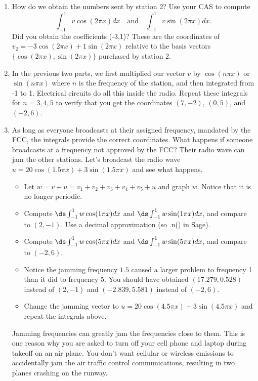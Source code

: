 \begin{enumerate}
\begin{enumerate}
	\item How do we obtain the numbers sent by station 2? Use your CAS to compute
	$$ \int_{-1}^1 v \cos(2 \pi x) dx \quad \text{and}\quad \int_{-1}^1 v \sin(2 \pi x) dx .$$
	Did you obtain the coefficients (-3,1)? These are the coordinates of $v_2 = -3\cos(2\pi x)+1\sin(2\pi x)$ relative to the basis vectors $\{\cos(2\pi x),\sin(2\pi x)\}$ purchased by station 2.  
	
	\item In the previous two parts, we first multiplied our vector $v$ by $\cos (n\pi x)$ or $\sin (n\pi x)$ where $n$ is the frequency of the station, and then integrated from -1 to 1. Electrical circuits do all this inside the radio. 
	Repeat these integrals for $n = 3,4,5$ to verify that you get the coordinates $(7,-2)$, $(0,5)$, and $(-2,6)$.
	
	\item As long as everyone broadcasts at their assigned frequency, mandated by the FCC, the integrals provide the correct coordinates.  
	What happens if someone broadcasts at a frequency not approved by the FCC?  
	Their radio wave can jam the other stations. 
	Let's broadcast the radio wave $u = 20\cos(1.5\pi x)+3\sin(1.5\pi x)$ and see what happens.  
\begin{itemize}
	\item Let $w=v+u = v_1+v_2+v_3+v_4+v_5+u$ and graph $w$. Notice that it is no longer periodic.  
	\item Compute $\ds \int_{-1}^1 w \cos(1 \pi x) dx$ and $\ds \int_{-1}^1 w \sin(1 \pi x) dx $, and compare  to $(2,-1)$. Use a decimal approximation (so .n() in Sage).
	\item Compute $\ds \int_{-1}^1 w \cos(5 \pi x) dx$ and $\ds \int_{-1}^1 w \sin(5 \pi x) dx $, and compare  to $(-2,6)$.
	\item Notice the jamming frequency $1.5$ caused a larger problem to frequency 1 than it did to frequency 5.  
	You should have obtained $(17.279, 0.528)$ instead of $(2,-1)$ and $(-2.839, 5.581)$ instead of $(-2,6)$.
	
	\item Change the jamming vector to $u = 20\cos(4.5\pi x)+3\sin(4.5\pi x)$ and repeat the integrals above. 
	
\end{itemize}

Jamming frequencies can greatly jam the frequencies close to them.  This is one reason why you are asked to turn off your cell phone and laptop during takeoff on an air plane.  You don't want cellular or wireless emissions to accidentally jam the air traffic control communications, resulting in two planes crashing on the runway. 


\end{enumerate}
\end{enumerate}
